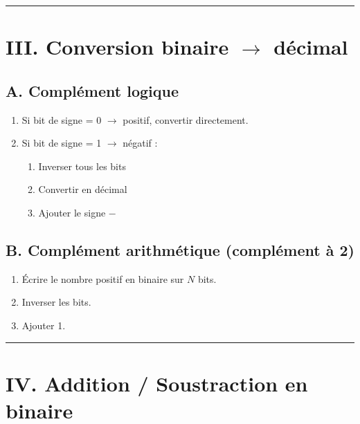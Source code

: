 \documentclass[a4paper,12pt]{article}
\begin{document}
  

\hrule
\section*{III. Conversion binaire $\rightarrow$ décimal} 

  

\subsection*{A. Complément logique} 

\begin{enumerate} 

    \item Si bit de signe = 0 $\rightarrow$ positif, convertir directement. 

    \item Si bit de signe = 1 $\rightarrow$ négatif : 

    \begin{enumerate} 

        \item Inverser tous les bits 

        \item Convertir en décimal 

        \item Ajouter le signe $-$ 

    \end{enumerate} 

\end{enumerate} 

  

\subsection*{B. Complément arithmétique (complément à 2)} 

\begin{enumerate} 

    \item Écrire le nombre positif en binaire sur $N$ bits. 

    \item Inverser les bits. 

    \item Ajouter 1. 

\end{enumerate} 

  

\hrule
\section*{IV. Addition / Soustraction en binaire} 
\end{document}

